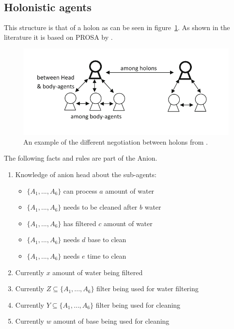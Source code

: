 	

\subsection{Holonistic agents}

This structure is that of a holon as can be seen in figure~\cref{fig:holonexample}. As shown in the literature it is based on PROSA by \citet{van1998reference}.
\begin{figure}
	\centering
	\includegraphics[width=0.7\linewidth]{img/holon_example}
	\caption{An example of the different negotiation between holons from \citet{beheshti2016negotiations}.}
	\label{fig:holonexample}
\end{figure}

The following facts and rules are part of the Anion.

\begin{enumerate}
	\item
	Knowledge of anion head about the sub-agents:
	\begin{itemize}
		\item {$\{A_1, ..., A_6\}$ can process $a$ amount of water}
		\item {$\{A_1, ..., A_6\}$ needs to be cleaned after $b$ water}
		\item {$\{A_1, ..., A_6\}$ has filtered $c$ amount of water}
		\item {$\{A_1, ..., A_6\}$ needs $d$ base to clean}
		\item {$\{A_1, ..., A_6\}$ needs $e$ time to clean}
	\end{itemize}
	\item
	Currently $x$ amount of water being filtered 
	\item
	Currently $Z \subseteq \{A_1, ..., A_6\}$ filter being used for water filtering
	\item
	Currently $Y \subseteq \{A_1, ..., A_6\}$ filter being used for cleaning
	\item
	Currently $w$ amount of base being used for cleaning
\end{enumerate}

